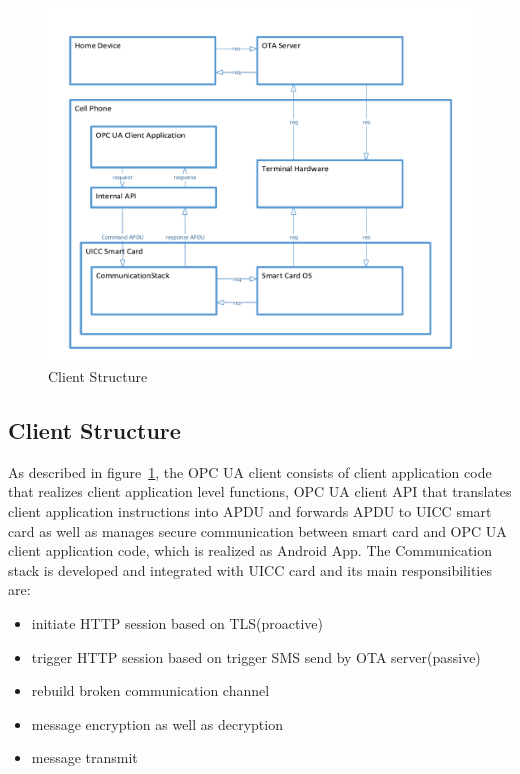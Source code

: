  \begin{figure}
	\centering
	\includegraphics[width=1.2\textwidth]{clientStructure}
		\caption{Client Structure}
	\label{fig:clientStructure}
\end{figure}
\subsection{Client Structure}
As described in figure~\ref{fig:clientStructure}, the OPC UA client consists of client application code that realizes client application level functions, OPC UA client API that translates client application instructions into APDU and forwards APDU to UICC smart card as well as  manages secure communication between smart card and OPC UA client application code, which is realized as Android  App. The Communication stack is developed and integrated with UICC card and its main responsibilities are:
\begin{itemize}
  \item initiate HTTP session based on TLS(proactive)
  \item trigger HTTP session based on trigger SMS send by OTA server(passive)
  \item rebuild broken communication channel
  \item message encryption as well as decryption
  \item message transmit
\end{itemize}

